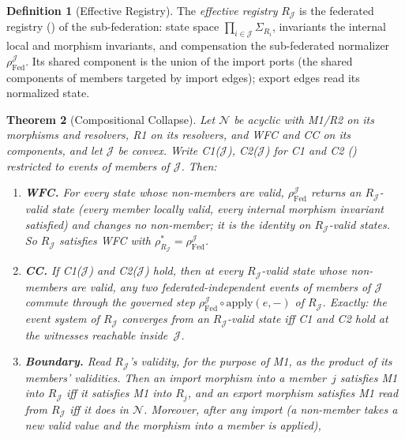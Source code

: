 \documentclass[11pt,a4paper]{article}
\theoremstyle{plain}
\newtheorem{theorem}{Theorem}[section]
\theoremstyle{definition}
\newtheorem{definition}[theorem]{Definition}
\theoremstyle{remark}
\newcommand{\apply}{\mathrm{apply}}
\newcommand{\Fed}{\mathrm{Fed}}
\renewcommand{\_}{\textunderscore\allowbreak}
\begin{document}
\begin{definition}[Effective Registry]
\label{def:effreg}
The \emph{effective registry} $R_{\mathcal{J}}$ is the federated registry
() of the sub-federation: state space
$\prod_{i \in \mathcal{J}} \Sigma_{R_i}$, invariants the internal local and
morphism invariants, and compensation the sub-federated normalizer
$\rho_{\Fed}^{\mathcal{J}}$.  Its shared component is the union of the import
ports (the shared components of members targeted by import edges); export edges
read its normalized state.
\end{definition}

\begin{theorem}[Compositional Collapse]
\label{thm:collapse}
Let $\mathcal{N}$ be acyclic with M1/R2 on its morphisms and resolvers, R1 on
its resolvers, and WFC and CC on its components, and let $\mathcal{J}$ be
convex.  Write C1($\mathcal{J}$), C2($\mathcal{J}$) for C1 and C2
() restricted to events of members of $\mathcal{J}$.  Then:
\begin{enumerate}[leftmargin=*,nosep,label=(\alph*)]
\item \textbf{WFC.}  For every state whose non-members are valid,
  $\rho_{\Fed}^{\mathcal{J}}$ returns an $R_{\mathcal{J}}$-valid state (every
  member locally valid, every internal morphism invariant satisfied) and
  changes no non-member; it is the identity on $R_{\mathcal{J}}$-valid states.
  So $R_{\mathcal{J}}$ satisfies WFC with
  $\rho_{R_{\mathcal{J}}}^* = \rho_{\Fed}^{\mathcal{J}}$.
\item[(a$'$)] \textbf{CC.}  If C1($\mathcal{J}$) and C2($\mathcal{J}$) hold,
  then at every $R_{\mathcal{J}}$-valid state whose non-members are valid, any
  two federated-independent events of members of $\mathcal{J}$ commute through
  the governed step $\rho_{\Fed}^{\mathcal{J}} \circ \apply(e, -)$ of
  $R_{\mathcal{J}}$.  Exactly: the event system of $R_{\mathcal{J}}$ converges
  from an $R_{\mathcal{J}}$-valid state iff C1 and C2 hold at the witnesses
  reachable inside~$\mathcal{J}$.
\item \textbf{Boundary.}  Read $R_{\mathcal{J}}$'s validity, for the purpose of
  M1, as the product of its members' validities.  Then an import morphism into
  a member~$j$ satisfies M1 into $R_{\mathcal{J}}$ iff it satisfies M1 into
  $R_j$, and an export morphism satisfies M1 read from $R_{\mathcal{J}}$ iff it
  does in $\mathcal{N}$.  Moreover, after any import (a non-member takes a new
  valid value and the morphism into a member is applied),

\end{enumerate}
\end{theorem}
\end{document}
